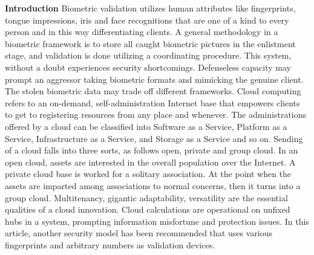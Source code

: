 \documentclass[12pt]{article}
\begin{document}
\textbf{\large  Introduction} \newline \newline \newline
Biometric validation utilizes human attributes like fingerprints, tongue impressions, iris and face recognitions that are one of a kind to every person and in this way differentiating clients. A general methodology in a biometric framework is to store all caught biometric pictures in the enlistment stage, and validation is done utilizing a coordinating procedure. This system, without a doubt experiences security shortcomings. Defenseless capacity may prompt an aggressor taking biometric formats and mimicking the genuine client. The stolen biometric data may trade off different frameworks. Cloud computing refers to an on-demand, self-administration Internet base that empowers clients to get to registering resources from any place and whenever. The administrations offered by a cloud can be classified into Software as a Service, Platform as a Service, Infrastructure as a Service, and Storage as a Service and so on. Sending of a cloud falls into three sorts, as follows open, private and group cloud. In an open cloud, assets are interested in the overall population over the Internet. A private cloud base is worked for a solitary association. At the point when the assets are imparted among associations to normal concerns, then it turns into a group cloud. Multitenancy, gigantic adaptability, versatility are the essential qualities of a cloud innovation. Cloud calculations are operational on unfixed hubs in a system, prompting information misfortune and protection issues. In this article, another security model has been recommended that uses various fingerprints and arbitrary numbers as validation devices. \newpage
\end{document}
